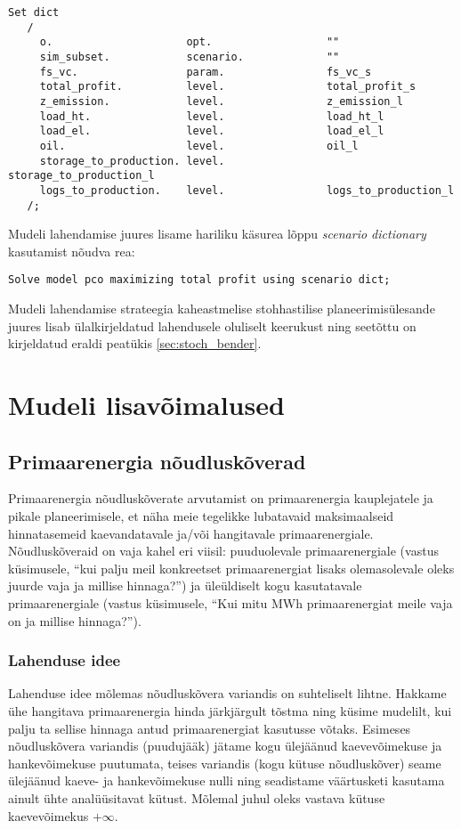 \documentclass[10pt,a4paper]{article}
\begin{document}
\begin{verbatim}
Set dict
   /
     o.                     opt.                  ""
     sim_subset.            scenario.             ""
     fs_vc.                 param.                fs_vc_s
     total_profit.          level.                total_profit_s
     z_emission.            level.                z_emission_l
     load_ht.               level.                load_ht_l
     load_el.               level.                load_el_l
     oil.                   level.                oil_l
     storage_to_production. level.                storage_to_production_l
     logs_to_production.    level.                logs_to_production_l
   /;
\end{verbatim}
Mudeli lahendamise juures lisame hariliku käsurea lõppu \emph{scenario dictionary} kasutamist nõudva rea:
\begin{verbatim}
Solve model pco maximizing total profit using scenario dict;
\end{verbatim}

Mudeli lahendamise strateegia kaheastmelise stohhastilise planeerimisülesande juures lisab ülalkirjeldatud lahendusele oluliselt keerukust ning seetõttu on kirjeldatud eraldi peatükis \ref{sec:stoch_bender}.

\section{Mudeli lisavõimalused}
\label{sec:lisad}
\subsection{Primaarenergia nõudluskõverad}
Primaarenergia nõudluskõverate arvutamist on primaarenergia kauplejatele ja pikale planeerimisele, et näha meie tegelikke lubatavaid maksimaalseid hinnatasemeid kaevandatavale ja/või hangitavale primaarenergiale. Nõudluskõveraid on vaja kahel eri viisil: puuduolevale primaarenergiale (vastus küsimusele, ``kui palju meil konkreetset primaarenergiat lisaks olemasolevale oleks juurde vaja ja millise hinnaga?'') ja üleüldiselt kogu kasutatavale primaarenergiale (vastus küsimusele, ``Kui mitu MWh primaarenergiat meile vaja on ja millise hinnaga?'').
\subsubsection{Lahenduse idee}
Lahenduse idee mõlemas nõudluskõvera variandis on suhteliselt lihtne. Hakkame ühe hangitava primaarenergia hinda järkjärgult tõstma ning küsime mudelilt, kui palju ta sellise hinnaga antud primaarenergiat kasutusse võtaks. Esimeses nõudluskõvera variandis (puudujääk) jätame kogu ülejäänud kaevevõimekuse ja hankevõimekuse puutumata, teises variandis (kogu kütuse nõudluskõver) seame ülejäänud kaeve- ja hankevõimekuse nulli ning seadistame väärtusketi kasutama ainult ühte analüüsitavat kütust. Mõlemal juhul oleks vastava kütuse kaevevõimekus $+\infty$.
\end{document}
